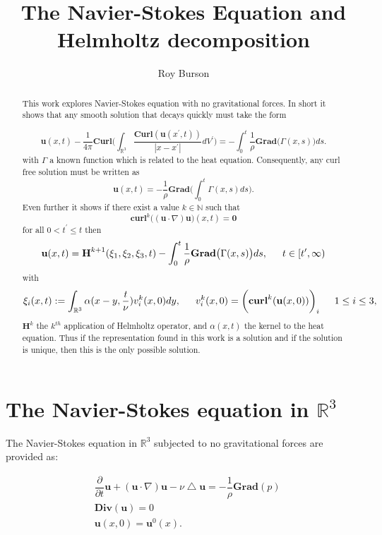 \documentclass[amsmath,12pt,a4paper]{amsart}
\begin{document}
\title[The Navier-Stokes Equation and Helmholtz decomposition]{The Navier-Stokes Equation and Helmholtz decomposition}
\author{Roy Burson}
\maketitle

\begin{abstract}
This work explores Navier-Stokes equation with no gravitational forces. In short it shows that any smooth solution that decays quickly must take the form 

$$ \textbf{u}(x,t)- \dfrac{1}{4\pi}\textbf{Curl}\Biggl( \int_{\mathbb{R}^3}^{}{\dfrac{\textbf{Curl} (\textbf{u} (x^\prime,t))}{|x-x^\prime|}}dV^\prime\Biggr) = -\int_{0}^{t}{\dfrac{1}{\rho}  \textbf{Grad}\big(\Gamma(x,s)\big)}ds.$$ 
 with $\Gamma$ a known function which is related to the heat equation. Consequently, any curl free solution must be written as
$$\textbf{u}(x,t) = -\dfrac{1}{\rho} \textbf{Grad}\biggl(\int_{0}^{t}{\Gamma(x,s) ds}\biggr).$$ Even further it shows if there exist a value $k\in \mathbb{N}$ such that $$\textbf{curl}^k\biggl((\textbf{u}\cdot \nabla )\textbf{u}\biggr)(x,t)=\textbf{0}$$ for all $0<t^\prime\le t$ then $$\textbf{u}(x,t) = \textbf{H}^{k+1}(\xi_1,\xi_2,\xi_3,t) -\int_{0}^{t}{\dfrac{1}{\rho}  \textbf{Grad}\big(\Gamma(x,s)\big)}ds, \indent t\in [t^\prime,\infty)$$ with $$\xi_i(x,t):= \int_{\mathbb{R}^3}^{}{\alpha(x-y,\dfrac{t}{\nu})v^k_i(x,0)}dy, \indent v^k_i(x,0) = \biggl(\textbf{curl}^k(\textbf{u}(x,0))\biggr)_i \indent 1\le i\le 3,$$ $\textbf{H}^k$ the $k^{th}$ application of Helmholtz operator, and $\alpha(x,t)$ the kernel to the heat equation. Thus if the representation found in this work is a solution and if the solution is unique, then this is the only possible solution. 
\end{abstract}

\section{The Navier-Stokes equation in $\mathbb{R}^3$}\label{S1}

The Navier-Stokes equation in $\mathbb{R}^3$ subjected to no gravitational forces are provided as:

\begin{align}
 &\dfrac{\partial }{\partial t} \textbf{u} + \left(\textbf{u}\cdot \nabla \right)\textbf{u} -    \nu \bigtriangleup \textbf{u} = -\dfrac{1}{\rho}  \textbf{Grad}(p)\label{Eq1}\\
&\textbf{Div}(\textbf{u})  = 0 \label{Eq2}\\
&\textbf{u}(x,0) = \textbf{u}^0(x).\label{Eq3}
\end{align}
\end{document}
